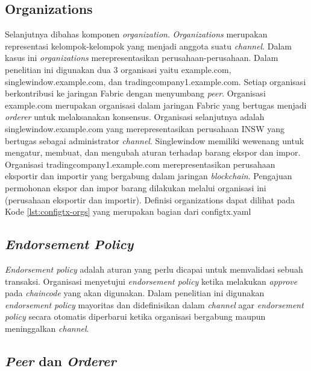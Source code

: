 \subsection{Organizations}
\label{subsec:organization}

Selanjutnya dibahas komponen \textit{organization}. \textit{Organizations} merupakan representasi kelompok-kelompok yang menjadi anggota suatu \textit{channel}. Dalam kasus ini \textit{organizations} merepresentasikan perusahaan-perusahaan. Dalam penelitian ini digunakan dua 3 organisasi yaitu example.com, singlewindow.example.com, dan tradingcompany1.example.com. Setiap organisasi berkontribusi ke jaringan Fabric dengan menyumbang \textit{peer}. Organisasi example.com merupakan organisasi dalam jaringan Fabric yang bertugas menjadi \textit{orderer} untuk melaksanakan konsensus. Organisasi selanjutnya adalah singlewindow.example.com yang merepresentasikan perusahaan INSW yang bertugas sebagai administrator \textit{channel}. Singlewindow memiliki wewenang untuk mengatur, membuat, dan mengubah aturan terhadap barang ekspor dan impor. Organisasi tradingcompany1.example.com merepresentasikan perusahaan eksportir dan importir yang bergabung dalam jaringan \textit{blockchain}. Pengajuan permohonan ekspor dan impor barang dilakukan melalui organisasi ini (perusahaan eksportir dan importir). Definisi organizations dapat dilihat pada Kode \ref{lst:configtx-orgs} yang merupakan bagian dari configtx.yaml



\subsection{\textit{Endorsement Policy}}
\textit{Endorsement policy} adalah aturan yang perlu dicapai untuk memvalidasi sebuah transaksi. Organisasi menyetujui \textit{endorsement policy} ketika melakukan \textit{approve} pada \textit{chaincode} yang akan digunakan. Dalam penelitian ini digunakan \textit{endorsement policy} mayoritas dan didefinisikan dalam \textit{channel} agar \textit{endorsement policy} secara otomatis diperbarui ketika organisasi bergabung maupun meninggalkan \textit{channel}.

\subsection{\textit{Peer} dan \textit{Orderer}}
\label{subsec:peer-orderer}

